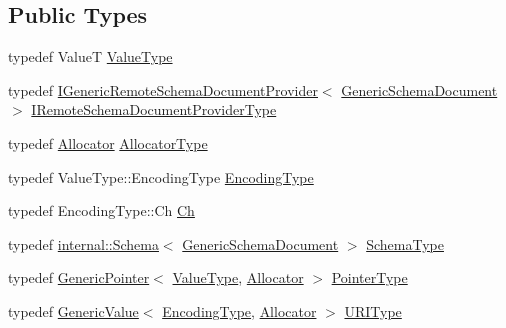 \subsection*{Public Types}
\begin{DoxyCompactItemize}
\item 
typedef ValueT \mbox{\hyperlink{classrapidjson_1_1_generic_schema_document_a87eb1db271e7f57442802a5f4f6178f3}{Value\+Type}}
\item 
typedef \mbox{\hyperlink{classrapidjson_1_1_i_generic_remote_schema_document_provider}{I\+Generic\+Remote\+Schema\+Document\+Provider}}$<$ \mbox{\hyperlink{classrapidjson_1_1_generic_schema_document}{Generic\+Schema\+Document}} $>$ \mbox{\hyperlink{classrapidjson_1_1_generic_schema_document_ab2764f2258889b3262eff6293d7ca015}{I\+Remote\+Schema\+Document\+Provider\+Type}}
\item 
typedef \mbox{\hyperlink{classrapidjson_1_1_allocator}{Allocator}} \mbox{\hyperlink{classrapidjson_1_1_generic_schema_document_a6fc497ef6e303b3a3ecec9fefe82eade}{Allocator\+Type}}
\item 
typedef Value\+Type\+::\+Encoding\+Type \mbox{\hyperlink{classrapidjson_1_1_generic_schema_document_a019035fd281ca52874ed434ce4f7d4d8}{Encoding\+Type}}
\item 
typedef Encoding\+Type\+::\+Ch \mbox{\hyperlink{classrapidjson_1_1_generic_schema_document_af9b82162834b30bdcbe93cb065d0aedd}{Ch}}
\item 
typedef \mbox{\hyperlink{classrapidjson_1_1internal_1_1_schema}{internal\+::\+Schema}}$<$ \mbox{\hyperlink{classrapidjson_1_1_generic_schema_document}{Generic\+Schema\+Document}} $>$ \mbox{\hyperlink{classrapidjson_1_1_generic_schema_document_aaf4e7f371de938025f7ed4be3b83266e}{Schema\+Type}}
\item 
typedef \mbox{\hyperlink{classrapidjson_1_1_generic_pointer}{Generic\+Pointer}}$<$ \mbox{\hyperlink{classrapidjson_1_1_generic_schema_document_a87eb1db271e7f57442802a5f4f6178f3}{Value\+Type}}, \mbox{\hyperlink{classrapidjson_1_1_allocator}{Allocator}} $>$ \mbox{\hyperlink{classrapidjson_1_1_generic_schema_document_a61540c0f8aa542760ae03257a0e6dab7}{Pointer\+Type}}
\item 
typedef \mbox{\hyperlink{classrapidjson_1_1_generic_value}{Generic\+Value}}$<$ \mbox{\hyperlink{classrapidjson_1_1_generic_schema_document_a019035fd281ca52874ed434ce4f7d4d8}{Encoding\+Type}}, \mbox{\hyperlink{classrapidjson_1_1_allocator}{Allocator}} $>$ \mbox{\hyperlink{classrapidjson_1_1_generic_schema_document_a72e8240701d707953bfd806cddc995b6}{U\+R\+I\+Type}}
\end{DoxyCompactItemize}
